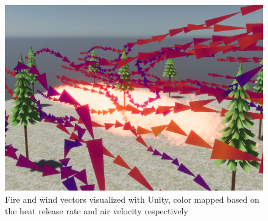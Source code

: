 \begin{figure}
\centering
\includegraphics[scale=.45]{Figures/WindFire.png}
\decoRule
\caption[Unity View of wind vectors]{Fire and wind vectors visualized with Unity, color mapped based on the heat release rate and air velocity respectively}
\label{fig:WindFire}
\end{figure}